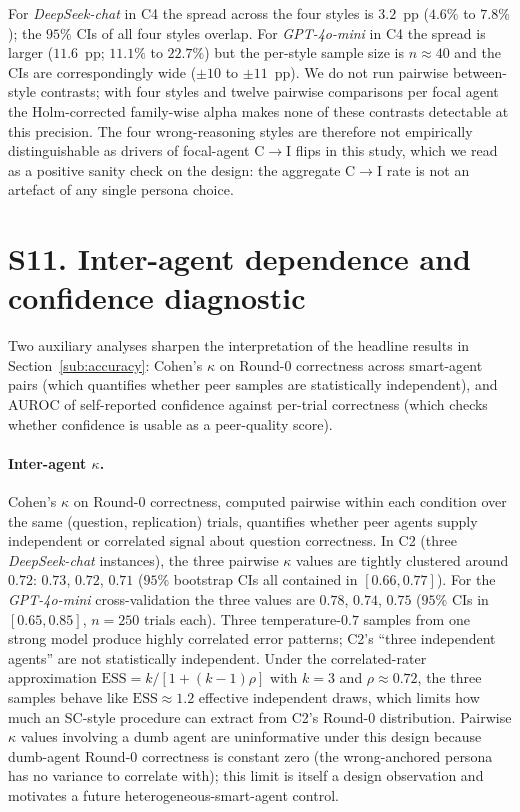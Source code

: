 \documentclass[11pt]{article}
\begin{document}
For \textit{DeepSeek-chat} in C4 the spread across the four
styles is $3.2$~pp ($4.6\%$ to $7.8\%$); the $95\%$ CIs of all four
styles overlap.
For \textit{GPT-4o-mini} in C4 the spread is larger ($11.6$~pp;
$11.1\%$ to $22.7\%$) but the per-style sample size is $n \approx 40$
and the CIs are correspondingly wide ($\pm 10$ to $\pm 11$~pp).
We do not run pairwise between-style contrasts; with four styles and
twelve pairwise comparisons per focal agent the Holm-corrected
family-wise alpha makes none of these contrasts detectable at this
precision.
The four wrong-reasoning styles are therefore not empirically
distinguishable as drivers of focal-agent C$\rightarrow$I flips in
this study, which we read as a positive sanity check on the design:
the aggregate C$\rightarrow$I rate is not an artefact of any single
persona choice.

\section*{S11. Inter-agent dependence and confidence diagnostic}
\label{ssec:dependence_app}

Two auxiliary analyses sharpen the interpretation of the headline
results in Section~\ref{sub:accuracy}: Cohen's $\kappa$ on Round-0
correctness across smart-agent pairs (which quantifies whether peer
samples are statistically independent), and AUROC of self-reported
confidence against per-trial correctness (which checks whether
confidence is usable as a peer-quality score).

\paragraph{Inter-agent $\kappa$.}
Cohen's $\kappa$ on Round-0 correctness, computed pairwise within
each condition over the same (question, replication) trials,
quantifies whether peer agents supply independent or correlated
signal about question correctness.
In C2 (three \textit{DeepSeek-chat} instances), the three
pairwise $\kappa$ values are tightly clustered around $0.72$:
$0.73$, $0.72$, $0.71$ ($95\%$ bootstrap CIs all contained in
$[0.66, 0.77]$).
For the \textit{GPT-4o-mini} cross-validation the three values are
$0.78$, $0.74$, $0.75$ ($95\%$ CIs in $[0.65, 0.85]$,
$n = 250$ trials each).
Three temperature-$0.7$ samples from one strong model produce highly
correlated error patterns; C2's ``three independent agents'' are not
statistically independent.
Under the correlated-rater approximation
$\mathrm{ESS} = k / [1 + (k-1)\rho]$ with $k = 3$ and
$\rho \approx 0.72$, the three samples behave like
$\mathrm{ESS} \approx 1.2$ effective independent draws, which limits
how much an SC-style procedure can extract from C2's Round-0
distribution.
Pairwise $\kappa$ values involving a dumb agent are uninformative
under this design because dumb-agent Round-0 correctness is constant
zero (the wrong-anchored persona has no variance to correlate with);
this limit is itself a design observation and motivates a future
heterogeneous-smart-agent control.
\end{document}
